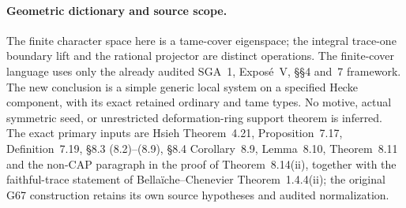 \paragraph{Geometric dictionary and source scope.}
The finite character space here is a tame-cover eigenspace;
the integral trace-one boundary lift and the rational
projector are distinct operations.  The finite-cover
language uses only the already audited SGA~1,
Expos\'e~V, \S\S4 and~7 framework.
The new conclusion is a simple generic local system
on a specified Hecke component, with its exact retained
ordinary and tame types.  No motive, actual symmetric
seed, or unrestricted deformation-ring support theorem
is inferred.  The exact primary inputs are Hsieh
Theorem~4.21, Proposition~7.17, Definition~7.19,
\S8.3 (8.2)--(8.9), \S8.4 Corollary~8.9,
Lemma~8.10, Theorem~8.11 and the non-CAP paragraph in
the proof of Theorem~8.14(ii), together with the
faithful-trace statement of Bella\"iche--Chenevier
Theorem~1.4.4(ii); the original G67 construction retains
its own source hypotheses and audited normalization.
